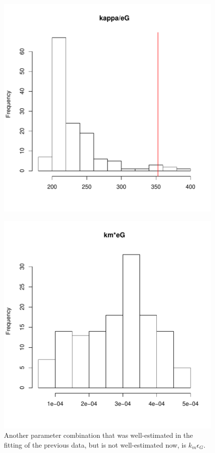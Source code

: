 \documentclass[12pt,reqno,final]{amsart}
\theoremstyle{plain}
\numberwithin{equation}{part}
\begin{document}
\begin{figure}
\includegraphics{Solving_the_problem_of_parameter_covariation_3-004}
\end{figure}


\begin{figure}
\includegraphics{Solving_the_problem_of_parameter_covariation_3-005}
\caption{Another parameter combination that was well-estimated in the fitting
of the previous data, but is not well-estimated now, is $k_m
\epsilon_G$.}
\end{figure}
\end{document}

